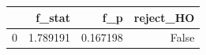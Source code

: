 \begin{tabular}{lrrr}
\toprule
 & f_stat & f_p & reject_HO \\
\midrule
0 & 1.789191 & 0.167198 & False \\
\bottomrule
\end{tabular}
